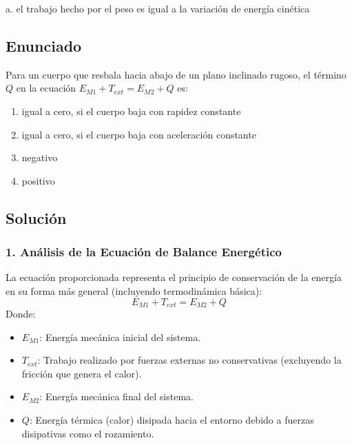 \documentclass[12pt, a4paper]{article}
\begin{document}
\begin{tcolorbox}[colback=green!5!white, colframe=green!50!black, title=Respuesta Correcta]
\centering \Large a. el trabajo hecho por el peso es igual a la variación de energía cinética
\end{tcolorbox}

\newpage

\subsection*{Enunciado}
Para un cuerpo que resbala hacia abajo de un plano inclinado rugoso, el término $Q$ en la ecuación $E_{M1} + T_{ext} = E_{M2} + Q$ es:
\begin{enumerate}[label=\alph*.]
    \item igual a cero, si el cuerpo baja con rapidez constante
    \item igual a cero, si el cuerpo baja con aceleración constante
    \item negativo
    \item positivo
\end{enumerate}

\subsection*{Solución}

\subsubsection*{1. Análisis de la Ecuación de Balance Energético}
La ecuación proporcionada representa el principio de conservación de la energía en su forma más general (incluyendo termodinámica básica):
$$E_{M1} + T_{ext} = E_{M2} + Q$$
Donde:
\begin{itemize}
    \item $E_{M1}$: Energía mecánica inicial del sistema.
    \item $T_{ext}$: Trabajo realizado por fuerzas externas no conservativas (excluyendo la fricción que genera el calor).
    \item $E_{M2}$: Energía mecánica final del sistema.
    \item $Q$: Energía térmica (calor) disipada hacia el entorno debido a fuerzas disipativas como el rozamiento.
\end{itemize}
\end{document}
